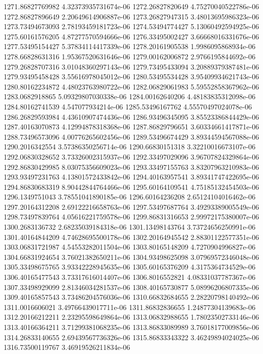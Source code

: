 {1271.86827769982 4.32373935731674e-06
1272.26827820649 4.75270040522786e-06
1272.86827896649 2.20649614906887e-06
1273.26827947315 3.48013695986323e-06
1273.73494673093 2.78193459181723e-06
1274.53494774427 5.13060492594925e-06
1275.60161576205 4.87277570594666e-06
1276.33495002427 3.66668016331676e-06
1277.53495154427 5.37834114417339e-06
1278.20161905538 1.9986095868934e-06
1278.66828631316 1.95367520631646e-06
1279.00162006872 2.9766195844692e-06
1279.26828707316 3.01048360297143e-06
1279.73495433094 3.20889379387481e-06
1279.93495458428 3.55616978045012e-06
1280.53495534428 3.95409934621743e-06
1280.80162234872 4.48023763980722e-06
1282.06829061983 5.59552858367962e-06
1283.0682918865 5.09329807030338e-06
1284.00162640206 4.48183835312098e-06
1284.80162741539 4.547077934214e-06
1285.53496167762 4.55570497024078e-06
1286.26829593984 4.43610907474436e-06
1286.93496345095 3.85523386844429e-06
1287.40163070873 4.12994878318368e-06
1287.86829796651 3.60334661417871e-06
1288.73496573096 4.00776265602456e-06
1289.53496674429 3.89344594567088e-06
1290.2016342554 3.57386350256714e-06
1290.66830151318 3.32210016673107e-06
1292.06830328652 3.73326002315937e-06
1292.33497029096 3.96707824329864e-06
1292.86830429985 8.03075356609023e-06
1293.33497155763 3.83207963210983e-06
1293.93497231763 4.13801572433842e-06
1294.40163957541 3.89341747422695e-06
1294.86830683319 8.90442844764466e-06
1295.60164109541 4.75185132454503e-06
1296.1349751043 3.78551041890185e-06
1296.60164236208 2.65124104016462e-06
1297.20164312208 2.69122216658763e-06
1297.53497687764 3.49293389005549e-06
1298.73497839764 4.05616221759578e-06
1299.86831316653 2.99972175380007e-06
1300.2683136732 2.68235039184318e-06
1301.13498143764 3.73724656250991e-06
1301.40164844209 4.74628695500178e-06
1302.20164945542 2.88301122577351e-06
1303.06831721987 4.54553282011504e-06
1303.80165148209 4.7270904996827e-06
1304.66831924654 3.76021382650211e-06
1304.93498625098 3.07969572346048e-06
1305.33498675765 3.93342228945635e-06
1305.60165376209 4.3175364734529e-06
1306.40165477543 3.73317616014407e-06
1306.8016552821 4.08331037787367e-06
1307.33498929099 2.81346034281537e-06
1308.40165730877 5.08996206807335e-06
1309.40165857543 3.73486204576036e-06
1310.66832684655 2.28220798140492e-06
1311.0016606021 3.49766439017711e-06
1311.86832836655 1.24877304139683e-06
1312.20166212211 2.23295598649864e-06
1313.06832988655 1.78023502733146e-06
1313.40166364211 3.71299381068235e-06
1313.86833089989 3.76018177009856e-06
1314.26833140655 2.69439567736326e-06
1315.86833343322 3.46249894024025e-06
1316.73500119767 3.46919526211834e-06
}
